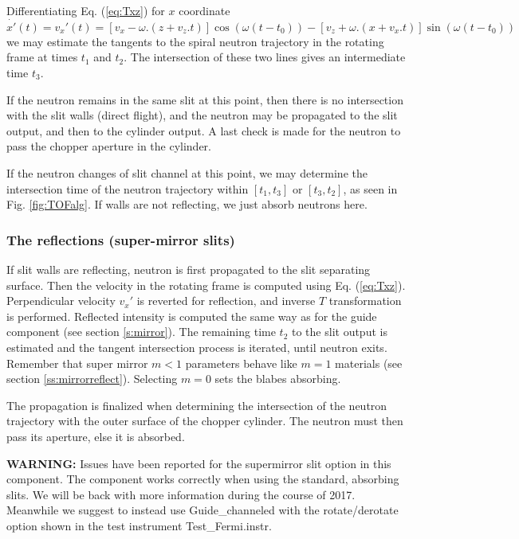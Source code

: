 Differentiating Eq. (\ref{eq:Txz}) for $x$ coordinate
\begin{equation}
\dot{x'}(t) = v_x'(t) = [v_x-\omega.(z+v_z.t)]\cos(\omega(t-t_0)) - [v_z+\omega.(x+v_x.t)]\sin(\omega(t-t_0))
\end{equation}
we may estimate the tangents to the spiral neutron trajectory in the rotating frame at times $t_1$ and $t_2$. The intersection of these two lines gives an intermediate time $t_3$.

If the neutron remains in the same slit at this point, then there is no intersection with the slit walls (direct flight), and the neutron may be propagated to the slit output, and then to the cylinder output. A last check is made for the neutron to pass the chopper aperture in the cylinder.

If the neutron changes of slit channel at this point, we may determine the intersection time of the neutron trajectory within $[ t_1, t_3 ]$ or $[ t_3, t_2 ]$, as seen in Fig. \ref{fig:TOFalg}. If walls are not reflecting, we just absorb neutrons here.

\subsubsection{The reflections (super-mirror slits)}

If slit walls are reflecting, neutron is first propagated to the slit separating surface. Then the velocity in the rotating frame is computed using Eq. (\ref{eq:Txz}). Perpendicular velocity $v_x'$ is reverted for reflection, and inverse $T$ transformation is performed. Reflected intensity is computed the same way as for the guide component (see section \ref{s:mirror}). The remaining time $t_2$ to the slit output is estimated and the tangent intersection process is iterated, until neutron exits. Remember that super mirror $m < 1$ parameters behave like $m=1$ materials (see section \ref{ss:mirrorreflect}). Selecting $m=0$ sets the blabes absorbing.

The propagation is finalized when determining the intersection of the neutron trajectory with the outer surface of the chopper cylinder. The neutron must then pass its aperture, else it is absorbed.

{\bf WARNING:} Issues have been reported for the supermirror slit option in this component. The component works correctly when using the standard, absorbing slits. We will be back with more information during the course of 2017. Meanwhile we suggest to instead use Guide_channeled with the rotate/derotate option shown in the test instrument Test_Fermi.instr. 

